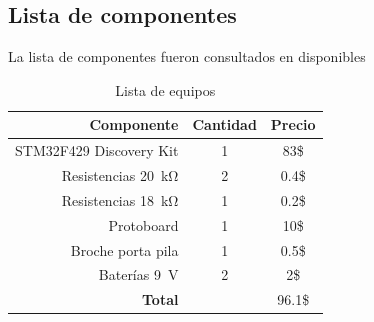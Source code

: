 \subsection*{Lista de componentes}
La lista de componentes fueron consultados en \cite{web2} disponibles
\begin{table}[H]
\caption{Lista de equipos}
\label{table_2}
\begin{center}
\begin{tabular}{r|cc}
\hline
\textbf{Componente}&\textbf{Cantidad}&\textbf{Precio}\\
 \hline
STM32F429 Discovery Kit& 1 & 83\$ \\ \hline 
Resistencias \SI{20}{\kilo\ohm}&2 & 0.4\$ \\ \hline 
Resistencias \SI{18}{\kilo\ohm}&1 & 0.2\$ \\ \hline 
Protoboard &1 &10\$ \\ \hline 
Broche porta pila &1 &0.5\$ \\ \hline 
Baterías \SI{9}{\volt} & 2& 2\$ \\ \hline 

 \textbf{Total}& & 96.1\$ \\
 \hline
\end{tabular}
\end{center}
\end{table}

